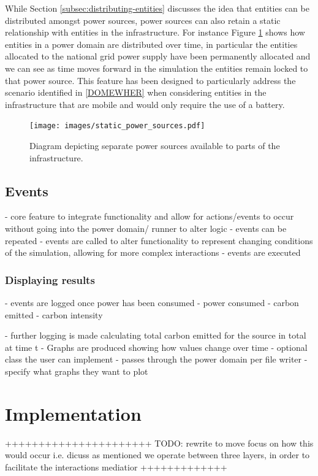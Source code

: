 \documentclass{l4proj}
\begin{document}
While Section \ref{subsec:distributing-entities} discusses the idea that entities can be distributed amongst power sources, power sources can also retain a static relationship with entities in the infrastructure.
For instance Figure \ref{fig:staticPower} shows how entities in a power domain are distributed over time, in particular the entities allocated to the national grid power supply have been permanently allocated and we can see as time moves forward in the simulation the entities remain locked to that power source.
This feature has been designed to particularly address the scenario identified in \ref{DOMEWHER} when considering entities in the infrastructure that are mobile and would only require the use of a battery.

\begin{figure}[htbp]
    \centering
    \texttt{[image: images/static\_power\_sources.pdf]}
    ~
    \caption{Diagram depicting separate power sources available to parts of the infrastructure.}
    \label{fig:staticPower}
\end{figure}

\section{Events}\label{sec:events}
- core feature to integrate functionality and allow for actions/events to occur without going into the power domain/ runner to alter logic
- events can be repeated
- events are called to alter functionality to represent changing conditions of the simulation, allowing for more complex interactions
- events are executed

\subsection{Displaying results}\label{subsec:displaying-results}


- events are logged once power has been consumed
- power consumed
- carbon emitted
- carbon intensity

- further logging is made calculating total carbon emitted for the source in total at time t
- Graphs are produced showing how values change over time
- optional class the user can implement
- passes through the power domain per file writer
- specify what graphs they want to plot
\chapter{Implementation}
++++++++++++++++++++++
TODO: rewrite to move focus on how this would occur i.e. dicuss as mentioned we operate between three layers, in order to facilitate the interactions mediatior
+++++++++++++
\end{document}
